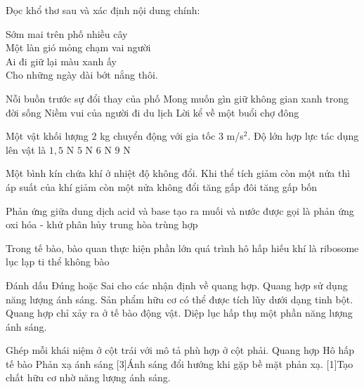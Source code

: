 \begin{ex}
Đọc khổ thơ sau và xác định nội dung chính:
\begin{center}
Sớm mai trên phố nhiều cây\\
Một làn gió mỏng chạm vai người\\
Ai đi giữ lại màu xanh ấy\\
Cho những ngày dài bớt nắng thôi.
\end{center}
\choice
{Nỗi buồn trước sự đổi thay của phố}
{\True Mong muốn gìn giữ không gian xanh trong đời sống}
{Niềm vui của người đi du lịch}
{Lời kể về một buổi chợ đông}
\end{ex}

\begin{ex}
Một vật khối lượng $2$ kg chuyển động với gia tốc $3$ m/s$^2$. Độ lớn hợp lực tác dụng lên vật là
\choice
{$1{,}5$ N}
{$5$ N}
{\True $6$ N}
{$9$ N}
\end{ex}

\begin{ex}
Một bình kín chứa khí ở nhiệt độ không đổi. Khi thể tích giảm còn một nửa thì áp suất của khí
\choice
{giảm còn một nửa}
{không đổi}
{\True tăng gấp đôi}
{tăng gấp bốn}
\end{ex}

\begin{ex}
Phản ứng giữa dung dịch acid và base tạo ra muối và nước được gọi là phản ứng
\choice
{oxi hóa - khử}
{phân hủy}
{\True trung hòa}
{trùng hợp}
\end{ex}

\begin{ex}
Trong tế bào, bào quan thực hiện phần lớn quá trình hô hấp hiếu khí là
\choice
{ribosome}
{lục lạp}
{\True ti thể}
{không bào}
\end{ex}

\begin{ex}
Đánh dấu Đúng hoặc Sai cho các nhận định về quang hợp.
\choiceTF
{\True Quang hợp sử dụng năng lượng ánh sáng.}
{\True Sản phẩm hữu cơ có thể được tích lũy dưới dạng tinh bột.}
{Quang hợp chỉ xảy ra ở tế bào động vật.}
{\True Diệp lục hấp thụ một phần năng lượng ánh sáng.}
\end{ex}

\begin{ex}
Ghép mỗi khái niệm ở cột trái với mô tả phù hợp ở cột phải.
\match
{Quang hợp}
{Hô hấp tế bào}
{Phản xạ ánh sáng}
[3]{Ánh sáng đổi hướng khi gặp bề mặt phản xạ.}
[1]{Tạo chất hữu cơ nhờ năng lượng ánh sáng.}
\end{ex}

